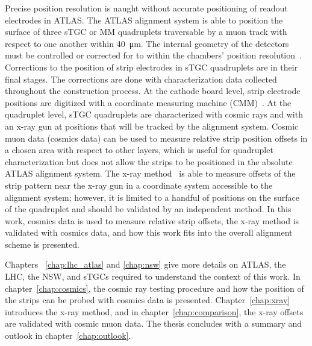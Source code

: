 Precise position resolution is naught without accurate positioning of readout electrodes in ATLAS. The ATLAS alignment system is able to position the surface of three sTGC or MM quadruplets traversable by a muon track with respect to one another within \SI{40}{\micro\meter}. The internal geometry of the detectors must be controlled or corrected for to within the chambers' position resolution~\cite{nsw_tdr}. Corrections to the position of strip electrodes in sTGC quadruplets are in their final stages. The corrections are done with characterization data collected throughout the construction process. At the cathode board level, strip electrode positions are digitized with a coordinate measuring machine (CMM)~\cite{carlson_results_2019}. At the quadruplet level, sTGC quadruplets are characterized with cosmic rays and with an x-ray gun at positions that will be tracked by the alignment system. Cosmic muon data (cosmics data) can be used to measure relative strip position offsets in a chosen area with respect to other layers, which is useful for quadruplet characterization but does not allow the strips to be positioned in the absolute ATLAS alignment system. The x-ray method~\cite{lefebvre_precision_2020} is able to measure offsets of the strip pattern near the x-ray gun in a coordinate system accessible to the alignment system; however, it is limited to a handful of positions on the surface of the quadruplet and should be validated by an independent method. In this work, cosmics data is used to measure relative strip offsets, the x-ray method is validated with cosmics data, and how this work fits into the overall alignment scheme is presented.

Chapters ~\ref{chap:lhc_atlas} and \ref{chap:nsw} give more details on ATLAS, the LHC, the NSW, and sTGCs required to understand the context of this work. In chapter~\ref{chap:cosmics}, the cosmic ray testing procedure and how the position of the strips can be probed with cosmics data is presented. Chapter~\ref{chap:xray} introduces the x-ray method, and in chapter~\ref{chap:comparison}, the x-ray offsets are validated with cosmic muon data. The thesis concludes with a summary and outlook in chapter~\ref{chap:outlook}.

